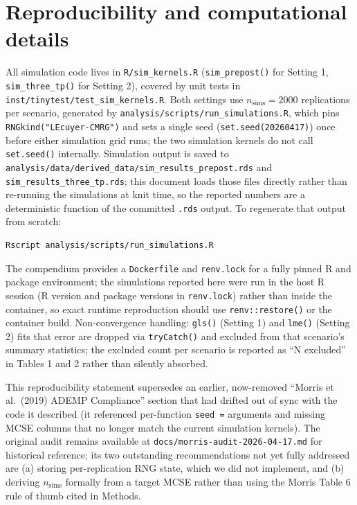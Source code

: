 \documentclass[
  11pt,
]{article}
\begin{document}
\section{Reproducibility and computational details}\label{reproducibility-and-computational-details}

All simulation code lives in \texttt{R/sim\_kernels.R}
(\texttt{sim\_prepost()} for Setting 1, \texttt{sim\_three\_tp()} for
Setting 2), covered by unit tests in
\texttt{inst/tinytest/test\_sim\_kernels.R}. Both settings use
\(n_{\mathrm{sims}} = 2000\) replications per scenario,
generated by \texttt{analysis/scripts/run\_simulations.R}, which
pins \texttt{RNGkind("L\textquotesingle{}Ecuyer-CMRG")} and sets a single seed
(\texttt{set.seed(20260417)}) once before either simulation grid
runs; the two simulation kernels do not call \texttt{set.seed()}
internally. Simulation output is saved to
\texttt{analysis/data/derived\_data/sim\_results\_prepost.rds} and
\texttt{sim\_results\_three\_tp.rds}; this document loads those
files directly rather than re-running the simulations at
knit time, so the reported numbers are a deterministic
function of the committed \texttt{.rds} output. To regenerate
that output from scratch:

\begin{verbatim}
Rscript analysis/scripts/run_simulations.R
\end{verbatim}

The compendium provides a \texttt{Dockerfile} and \texttt{renv.lock}
for a fully pinned R and package environment; the
simulations reported here were run in the host R session
(R version and package versions in \texttt{renv.lock}) rather
than inside the container, so exact runtime reproduction
should use \texttt{renv::restore()} or the container build.
Non-convergence handling: \texttt{gls()} (Setting 1) and \texttt{lme()}
(Setting 2) fits that error are dropped via \texttt{tryCatch()}
and excluded from that scenario's summary statistics; the
excluded count per scenario is reported as ``N excluded'' in
Tables 1 and 2 rather than silently absorbed.

This reproducibility statement supersedes an earlier,
now-removed ``Morris et al.~(2019) ADEMP Compliance''
section that had drifted out of sync with the code it
described (it referenced per-function \texttt{seed\ =} arguments
and missing MCSE columns that no longer match the current
simulation kernels). The original audit remains available
at \texttt{docs/morris-audit-2026-04-17.md} for historical
reference; its two outstanding recommendations not yet
fully addressed are (a) storing per-replication RNG state,
which we did not implement, and (b) deriving
\(n_{\mathrm{sims}}\) formally from a target MCSE rather than
using the Morris Table 6 rule of thumb cited in Methods.
\end{document}
